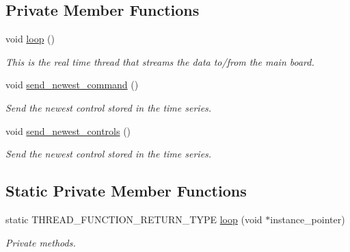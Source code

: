 \subsection*{Private Member Functions}
\begin{DoxyCompactItemize}
\item 
\mbox{\label{classblmc__drivers_1_1SpiBus_a21b3790ae435d8845c1a47e31d628cc9}} 
void \hyperlink{classblmc__drivers_1_1SpiBus_a21b3790ae435d8845c1a47e31d628cc9}{loop} ()
\begin{DoxyCompactList}\small\item\em This is the real time thread that streams the data to/from the main board. \end{DoxyCompactList}\item 
void \hyperlink{classblmc__drivers_1_1SpiBus_ad1332260ea455812464723ede9f2c1d1}{send\+\_\+newest\+\_\+command} ()
\begin{DoxyCompactList}\small\item\em Send the newest control stored in the time series. \end{DoxyCompactList}\item 
\mbox{\label{classblmc__drivers_1_1SpiBus_adedb766b0bcc857f3aa53e3468d4c02a}} 
void \hyperlink{classblmc__drivers_1_1SpiBus_adedb766b0bcc857f3aa53e3468d4c02a}{send\+\_\+newest\+\_\+controls} ()
\begin{DoxyCompactList}\small\item\em Send the newest control stored in the time series. \end{DoxyCompactList}\end{DoxyCompactItemize}
\subsection*{Static Private Member Functions}
\begin{DoxyCompactItemize}
\item 
static T\+H\+R\+E\+A\+D\+\_\+\+F\+U\+N\+C\+T\+I\+O\+N\+\_\+\+R\+E\+T\+U\+R\+N\+\_\+\+T\+Y\+PE \hyperlink{classblmc__drivers_1_1SpiBus_a1838b3861afd142bb5db570841baada1}{loop} (void $\ast$instance\+\_\+pointer)
\begin{DoxyCompactList}\small\item\em Private methods. \end{DoxyCompactList}\end{DoxyCompactItemize}

